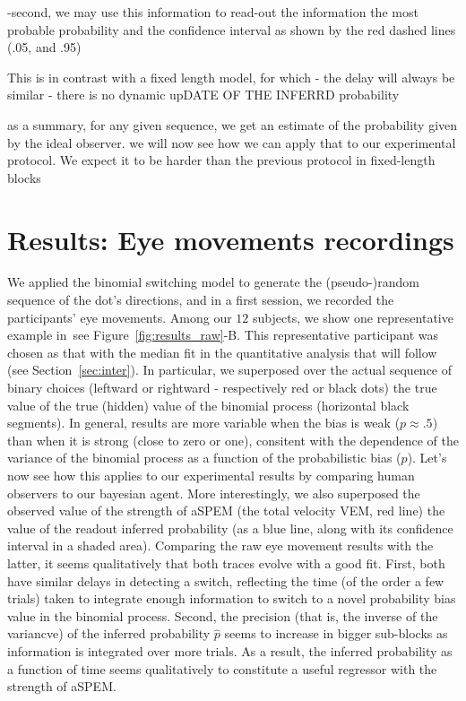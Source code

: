 \documentclass[profile,final,english, draft]{article}%
\newcommand{\seeFig}[1]{see Figure~\ref{fig:#1}}
\newcommand{\seeSec}[1]{see Section~\ref{sec:#1}}
\begin{document}
-second, we may use this information to read-out the information the most probable probability and the confidence interval as shown by the red dashed lines (.05, and .95)


This is in contrast with a fixed length model, for which
- the delay will always be similar
- there is no dynamic upDATE OF THE INFERRD probability


as a summary, for any given sequence,
 we get an estimate of the probability given by the ideal observer.
 we will now see how we can apply that to our experimental protocol.
 We expect it to be harder than the previous protocol
 in fixed-length blocks

\section{Results: Eye movements recordings}
\label{sec:eye_rec}
We applied the binomial switching model
to generate the (pseudo-)random sequence of
the dot's directions,
and in a first session, we recorded the participants' eye movements.
Among our $12$ subjects,
we show one representative example in~\seeFig{results_raw}-B.
This representative participant was chosen as that
with the median fit in the quantitative analysis
that will follow (\seeSec{inter}).
In particular, we superposed over the actual sequence of binary choices
(leftward or rightward - respectively red or black dots)
the true value of the true (hidden) value
of the binomial process (horizontal black segments).
In general, results are more variable when the bias is weak ($p\approx .5$)
than when it is strong (close to zero or one),
consitent with the dependence of the variance of the binomial process
as a function of the probabilistic bias ($p$).
Let's now see how this applies to our experimental results
by comparing human observers to our bayesian agent.
More interestingly, we also superposed
the observed value of the strength of aSPEM
(the total velocity VEM, red line)
the value of the readout inferred probability
(as a blue line, along with its confidence interval in a shaded area).
Comparing the raw eye movement results with the latter,
it seems qualitatively that both traces evolve with a good fit.
First, both have similar delays in detecting a switch,
reflecting the time (of the order a few trials) taken to integrate enough information
to switch to a novel probability bias value in the binomial process.
Second, the precision (that is, the inverse of the variancve)
of the inferred probability $\hat{p}$ seems to increase
in bigger sub-blocks as information is integrated over more trials.
As a result, the inferred probability as a function of time
seems qualitatively to constitute a useful regressor
with the strength of aSPEM.
\end{document}
